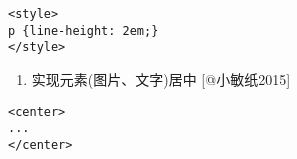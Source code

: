 \documentclass[]{article}
\providecommand{\tightlist}{%
  \setlength{\itemsep}{0pt}\setlength{\parskip}{0pt}}
\begin{document}
\begin{verbatim}
<style>
p {line-height: 2em;}
</style>
\end{verbatim}

\begin{enumerate}
\def\labelenumi{\arabic{enumi}.}
\tightlist
\item
  实现元素(图片、文字)居中 {[}@小敏纸2015{]}
\end{enumerate}

\begin{verbatim}
<center>
...
</center>
\end{verbatim}
\end{document}
